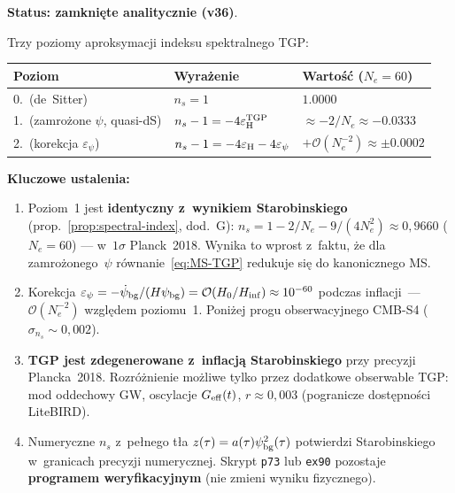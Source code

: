 \begin{remark}\label{rem:F7-ns-precision}
\textbf{Status: zamkni\k{e}te analitycznie (v36)}.

\smallskip\noindent
Trzy poziomy aproksymacji indeksu spektralnego TGP:

\begin{center}\small
\begin{tabular}{@{}lll@{}}
\toprule
\textbf{Poziom} & \textbf{Wyra\.zenie} & \textbf{Warto\'s\'c ($N_e=60$)} \\
\midrule
0.\ (de~Sitter) & $n_s = 1$ & $1.0000$ \\
1.\ (zamro\.zone $\psi$, quasi-dS) & $n_s - 1 = -4\varepsilon_{\rm H}^{\rm TGP}$ &
  $\approx -2/N_e \approx -0.0333$ \\
2.\ (korekcja $\varepsilon_\psi$) & $n_s - 1 = -4\varepsilon_{\rm H} - 4\varepsilon_\psi$ &
  $+\mathcal{O}(N_e^{-2}) \approx \pm 0.0002$ \\
\bottomrule
\end{tabular}
\end{center}

\smallskip\noindent
\textbf{Kluczowe ustalenia:}
\begin{enumerate}[nosep]
  \item Poziom~1 jest \textbf{identyczny z~wynikiem Starobinskiego}
    (prop.~\ref{prop:spectral-index}, dod.~G):
    $n_s = 1 - 2/N_e - 9/(4N_e^2) \approx 0{,}9660$ ($N_e=60$)
    --- w~$1\sigma$ Planck~2018.
    Wynika to wprost z~faktu, \.ze dla zamro\.zonego~$\psi$
    r\'ownanie~\eqref{eq:MS-TGP} redukuje si\k{e} do kanonicznego MS.
  \item Korekcja $\varepsilon_\psi = -\dot\psi_{\rm bg}/(H\psi_{\rm bg})
    = \mathcal{O}(H_0/H_{\rm inf}) \approx 10^{-60}$
    podczas inflacji~--- $\mathcal{O}(N_e^{-2})$ wzgl\k{e}dem poziomu~1.
    Poni\.zej progu obserwacyjnego CMB-S4 ($\sigma_{n_s} \sim 0{,}002$).
  \item \textbf{TGP jest zdegenerowane z~inflacj\k{a} Starobinskiego}
    przy precyzji Plancka~2018. Rozr\'o\.znienie mo\.zliwe tylko
    przez dodatkowe obserwable TGP: mod oddechowy GW, oscylacje $G_{\rm eff}(t)$,
    $r \approx 0{,}003$ (pogranicze dost\k{e}pno\'sci LiteBIRD).
  \item Numeryczne $n_s$ z~pe\l{}nego t\l{}a $z(\tau) = a(\tau)\psi_{\rm bg}^2(\tau)$
    potwierdzi Starobinskiego w~granicach precyzji numerycznej.
    Skrypt \texttt{p73} lub \texttt{ex90} pozostaje \textbf{programem
    weryfikacyjnym} (nie zmieni wyniku fizycznego).
\end{enumerate}
\end{remark}

